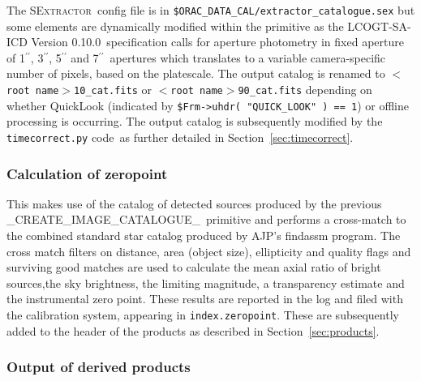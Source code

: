 \documentclass[twoside,11pt,nolof]{starlink}
\providecommand{\SEx}{\textsc{SExtractor}}
\providecommand{\task}[1]{\textsf{#1}}
\providecommand{\SAICD}{LCOGT-SA-ICD Version 0.10.0}
\providecommand{\Ast}{\texttt{timecorrect.py} code}
\begin{document}
The \SEx\ config file is in \texttt{\$ORAC\_DATA\_CAL/extractor\_catalogue.sex}
but some elements are dynamically modified within the primitive as the \SAICD\
specification calls for aperture photometry in fixed aperture of
1$^{\prime\prime}$,
3$^{\prime\prime}$, 5$^{\prime\prime}$ and 7$^{\prime\prime}$\ apertures which translates to a variable
camera-specific number of pixels, based on the platescale. The output catalog is
renamed to \texttt{$<$root name$>$10\_cat.fits} or \texttt{$<$root
name$>$90\_cat.fits} depending on whether QuickLook (indicated by
\texttt{\$Frm->uhdr( "QUICK\_LOOK" ) == 1}) or offline processing is occurring.
The output catalog is subsequently modified by the \Ast\ as further detailed in
Section~\ref{sec:timecorrect}.

\subsubsection{Calculation of zeropoint}

This makes use of the catalog of detected sources produced by the previous
\task{\_CREATE\_IMAGE\_CATALOGUE\_}\ primitive and performs a cross-match to the
combined standard star catalog produced by AJP's \task{findassm} program. The
cross match filters on distance, area (object size), ellipticity and quality
flags and surviving good matches are used to calculate the mean axial ratio of
bright sources,the sky brightness, the limiting magnitude, a transparency
estimate and the instrumental zero point. These results are reported in the log
and filed with the calibration system, appearing in \texttt{index.zeropoint}.
These are subsequently added to the header of the products as described in
Section~\ref{sec:products}.

\subsubsection{Output of derived products\label{sec:products}}
\end{document}
